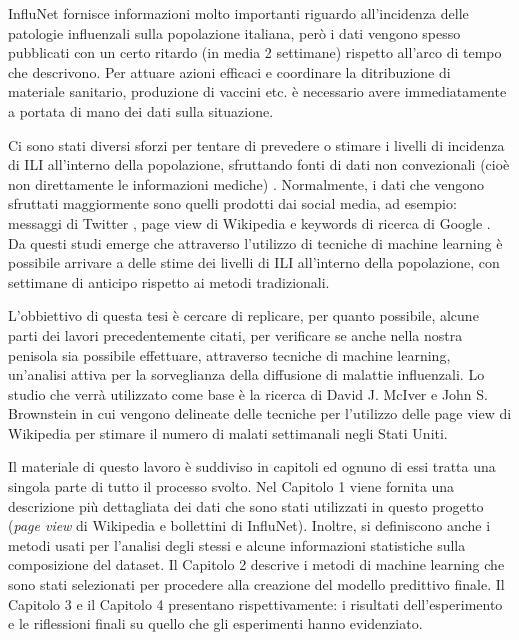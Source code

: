 InfluNet fornisce informazioni molto importanti riguardo all'incidenza delle patologie influenzali sulla popolazione
italiana, però i dati vengono spesso pubblicati con un certo ritardo (in media 2 settimane) rispetto all'arco di tempo che 
descrivono. Per attuare azioni efficaci e coordinare la ditribuzione di materiale sanitario, produzione di vaccini etc. è 
necessario avere immediatamente a portata di mano dei dati sulla situazione. 
\bigskip

Ci sono stati diversi sforzi per tentare di prevedere o stimare i livelli di incidenza di ILI all'interno della popolazione,
sfruttando fonti di dati non convezionali (cioè non direttamente le informazioni mediche) \cite{McIver2014, Hickmann2015, Generous2014, googleflutrends, Signorini2011}. Normalmente, i dati che vengono sfruttati 
maggiormente sono quelli prodotti dai social media, ad esempio: messaggi di Twitter \cite{Signorini2011}, page view di 
Wikipedia \cite{McIver2014, Hickmann2015, Generous2014} e keywords di ricerca di Google \cite{googleflutrends}. Da questi 
studi emerge che attraverso l'utilizzo di tecniche di machine learning è possibile arrivare a delle stime dei livelli di ILI 
all'interno della popolazione, con settimane di anticipo rispetto ai metodi tradizionali.
\bigskip

L'obbiettivo di questa tesi è cercare di replicare, per quanto possibile, alcune parti dei lavori precedentemente citati, per
verificare se anche nella nostra penisola sia possibile effettuare, attraverso tecniche di machine learning, un'analisi
attiva per la sorveglianza della diffusione di malattie influenzali. Lo studio che verrà utilizzato come base 
è la ricerca di David J. McIver e John S. Brownstein \cite{McIver2014} in cui vengono delineate delle tecniche per 
l'utilizzo delle page view di Wikipedia per stimare il numero di malati settimanali negli Stati Uniti.
\bigskip

Il materiale di questo lavoro è suddiviso in capitoli ed ognuno di essi tratta una singola parte di tutto il processo svolto. 
Nel Capitolo 1 viene fornita una descrizione più dettagliata dei dati che sono stati utilizzati in questo progetto
(\textit{page view} di Wikipedia e bollettini di InfluNet). Inoltre, si definiscono anche i metodi usati per l'analisi degli 
stessi e alcune informazioni statistiche sulla composizione del dataset.
Il Capitolo 2 descrive i metodi di machine learning che sono stati selezionati per procedere alla creazione
del modello predittivo finale.
Il Capitolo 3 e il Capitolo 4 presentano rispettivamente: i risultati dell'esperimento e le riflessioni finali su quello che
gli esperimenti hanno evidenziato.
\newpage




